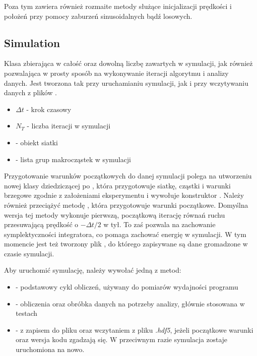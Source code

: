 Poza tym  zawiera również rozmaite metody służące inicjalizacji
prędkości i położeń przy pomocy zaburzeń sinusoidalnych bądź losowych.

\subsection{Simulation}
Klasa zbierająca w całość  oraz dowolną liczbę  zawartych w
symulacji, jak również pozwalająca w prosty sposób na wykonywanie iteracji
algorytmu i analizy danych. Jest tworzona tak przy uruchamianiu symulacji,
jak i przy wczytywaniu danych z plików .

\begin{itemize}
    \item $\Delta t$ - krok czasowy
    \item $N_T$ - liczba iteracji w symulacji
    \item {} - obiekt siatki
    \item {} - lista grup makrocząstek w symulacji
\end{itemize}

Przygotowanie warunków początkowych do danej symulacji polega na utworzeniu
nowej klasy dziedziczącej po , która przygotowuje siatkę,
cząstki i warunki brzegowe zgodnie z założeniami eksperymentu i wywołuje
konstruktor .  Należy również przeciążyć metodę
, która przygotowuje warunki początkowe.
Domyślna wersja tej metody wykonuje pierwszą, początkową iterację równań ruchu
przesuwającą prędkość o $-\Delta t / 2$ w tył. To zaś pozwala na zachowanie
symplektyczności integratora, co pomaga zachować energię w symulacji.  W tym
momencie jest też tworzony plik , do którego zapisywane są dane
gromadzone w czasie symulacji.

Aby uruchomić symulację, należy wywołać jedną z metod:
\begin{itemize}
     \item {} - podstawowy cykl obliczeń, używany do pomiarów
         wydajności programu
     \item {} - obliczenia oraz obróbka danych na potrzeby
         analizy, głównie stosowana w testach
     \item {} -  z zapisem do pliku oraz
         wczytaniem z pliku \emph{.hdf5}, jeżeli początkowe warunki oraz
         wersja kodu zgadzają się. W przeciwnym razie symulacja zostaje
         uruchomiona na nowo.
\end{itemize}

